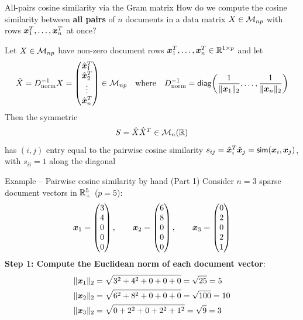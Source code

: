\documentclass[aspectratio=169]{beamer}\usepackage[]{graphicx}\usepackage[]{xcolor}
\begin{document}
\begin{frame}{All-pairs cosine similarity via the Gram matrix}
How do we compute the cosine similarity between \textbf{all pairs} of $n$ documents in a data matrix $X \in \mathcal{M}_{np}$ with rows $\bm{x}_1^T, \ldots, \bm{x}_n^T$ at once?
\vfill
\begin{importanttheorem}\label{th:cosine_gram}
Let $X \in \mathcal{M}_{np}$ have non-zero document rows $\bm{x}_1^T, \ldots, \bm{x}_n^T \in \mathbb{R}^{1 \times p}$ and let
\[
\hat{X} = D_{\text{norm}}^{-1} X = \begin{pmatrix} \hat{\bm{x}}_1^T \\ \hat{\bm{x}}_2^T \\ \vdots \\ \hat{\bm{x}}_n^T \end{pmatrix} \in \mathcal{M}_{np}
\quad\textrm{where}\quad
D_{\text{norm}}^{-1} = \mathsf{diag}\!\left(\frac{1}{\|\bm{x}_1\|_2}, \ldots, \frac{1}{\|\bm{x}_n\|_2}\right)
\]
Then the symmetric 
\[
S = \hat{X} \hat{X}^T \in \mathcal{M}_n(\mathbb{R})
\]
has $(i,j)$ entry equal to the pairwise cosine similarity $s_{ij} = \hat{\bm{x}}_i^T \hat{\bm{x}}_j = \mathsf{sim}(\bm{x}_i, \bm{x}_j)$, with $s_{ii} = 1$ along the diagonal
\end{importanttheorem}
\end{frame}


\begin{frame}{Example -- Pairwise cosine similarity by hand (Part 1)}
Consider $n=3$ sparse document vectors in $\mathbb{R}_+^5$ ($p = 5$):
\[
\bm{x}_1 = \begin{pmatrix} 3 \\ 4 \\ 0 \\ 0 \\ 0 \end{pmatrix}, \qquad
\bm{x}_2 = \begin{pmatrix} 6 \\ 8 \\ 0 \\ 0 \\ 0 \end{pmatrix}, \qquad
\bm{x}_3 = \begin{pmatrix} 0 \\ 2 \\ 0 \\ 2 \\ 1 \end{pmatrix}
\]
\vfill
\textbf{Step 1: Compute the Euclidean norm of each document vector}:
\begin{align*}
\|\bm{x}_1\|_2 &= \sqrt{3^2 + 4^2 + 0 + 0 + 0} = \sqrt{25} = 5 \\
\|\bm{x}_2\|_2 &= \sqrt{6^2 + 8^2 + 0 + 0 + 0} = \sqrt{100} = 10 \\
\|\bm{x}_3\|_2 &= \sqrt{0 + 2^2 + 0 + 2^2 + 1^2} = \sqrt{9} = 3
\end{align*}
\end{frame}
\end{document}
